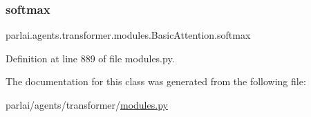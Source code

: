 \subsubsection{\texorpdfstring{softmax}{softmax}}
{\footnotesize\ttfamily parlai.\+agents.\+transformer.\+modules.\+Basic\+Attention.\+softmax}



Definition at line 889 of file modules.\+py.



The documentation for this class was generated from the following file\+:\begin{DoxyCompactItemize}
\item 
parlai/agents/transformer/\hyperlink{parlai_2agents_2transformer_2modules_8py}{modules.\+py}\end{DoxyCompactItemize}
